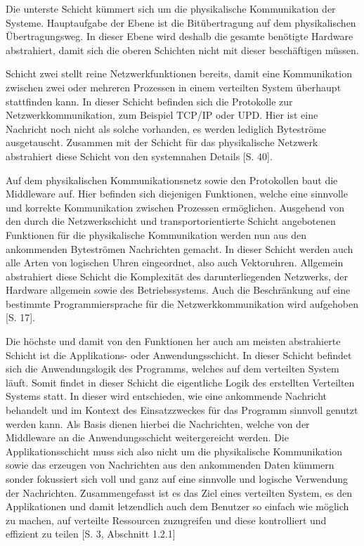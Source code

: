  Die unterste Schicht kümmert sich um die physikalische Kommunikation der Systeme. Hauptaufgabe der Ebene ist die Bitübertragung auf dem physikalischen Übertragungsweg. In dieser Ebene wird deshalb die gesamte benötigte Hardware abstrahiert, damit sich die oberen Schichten nicht mit dieser beschäftigen müssen. 
 
 Schicht zwei stellt reine Netzwerkfunktionen bereits, damit eine Kommunikation zwischen zwei oder mehreren Prozessen in einem verteilten System überhaupt stattfinden kann. In dieser Schicht befinden sich die Protokolle zur Netzwerkkommunikation, zum Beispiel TCP/IP oder UPD. Hier ist eine Nachricht noch nicht als solche vorhanden, es werden lediglich Byteströme ausgetauscht. Zusammen mit der Schicht für das physikalische Netzwerk abstrahiert diese Schicht von den systemnahen Details \cite{schill12}[S. 40].
 
 Auf dem physikalischen Kommunikationsnetz sowie den Protokollen baut die Middleware auf. Hier befinden sich diejenigen Funktionen, welche eine sinnvolle und korrekte Kommunikation zwischen Prozessen ermöglichen. Ausgehend von den durch die Netzwerkschicht und transportorientierte Schicht angebotenen Funktionen für die physikalische Kommunikation werden nun aus den ankommenden Byteströmen Nachrichten gemacht. In dieser Schicht werden auch alle Arten von logischen Uhren eingeordnet, also auch Vektoruhren. Allgemein abstrahiert diese Schicht die Komplexität des darunterliegenden Netzwerks, der Hardware allgemein sowie des Betriebssystems. Auch die Beschränkung auf eine bestimmte Programmiersprache für die Netzwerkkommunikation wird aufgehoben \cite{Coulouris2011}[S. 17].
 
 Die höchste und damit von den Funktionen her auch am meisten abstrahierte Schicht ist die Applikations- oder Anwendungsschicht. In dieser Schicht befindet sich die Anwendungslogik des Programms, welches auf dem verteilten System läuft. Somit findet in dieser Schicht die eigentliche Logik des erstellten Verteilten Systems statt. In dieser wird entschieden, wie eine ankommende Nachricht behandelt und im Kontext des Einsatzzweckes für das Programm sinnvoll genutzt werden kann. Als Basis dienen hierbei die Nachrichten, welche von der Middleware an die Anwendungsschicht weitergereicht werden. Die Applikationsschicht muss sich also nicht um die physikalische Kommunikation sowie das erzeugen von Nachrichten aus den ankommenden Daten kümmern sonder fokussiert sich voll und ganz auf eine sinnvolle und logische Verwendung der Nachrichten.
 Zusammengefasst ist es das Ziel eines verteilten System, es den Applikationen und damit letzendlich auch dem Benutzer so einfach wie möglich zu machen, auf verteilte Ressourcen zuzugreifen und diese kontrolliert und effizient zu teilen \cite{Tanenbaum2007}[S. 3, Abschnitt 1.2.1]

